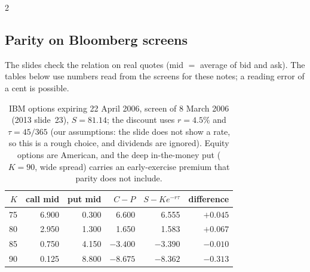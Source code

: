 \begin{paracol}{2}
\subsection{Parity on Bloomberg screens}
The slides check the relation on real quotes (mid $=$ average of bid and ask). The tables below use numbers read from the screens for these notes; a reading error of a cent is possible.
\begin{table}[ht]
\centering\small
\begin{tabular}{r r r r r r}
\toprule
$K$ & call mid & put mid & $C-P$ & $S-Ke^{-r\tau}$ & difference\\
\midrule
75 & 6.900 & 0.300 & 6.600 & 6.555 & $+0.045$\\
80 & 2.950 & 1.300 & 1.650 & 1.583 & $+0.067$\\
85 & 0.750 & 4.150 & $-3.400$ & $-3.390$ & $-0.010$\\
90 & 0.125 & 8.800 & $-8.675$ & $-8.362$ & $-0.313$\\
\bottomrule
\end{tabular}
\caption{IBM options expiring 22 April 2006, screen of 8 March 2006 (2013 slide~23), $S=81.14$; the discount uses $r=4.5\%$ and $\tau=45/365$ (our assumptions: the slide does not
show a rate, so this is a rough choice, and dividends are ignored). Equity options are American, and the deep in-the-money put ($K=90$, wide spread) carries an early-exercise premium that parity does not include.}\label{ch15:tab-ibm}
\end{table}


\end{paracol}
